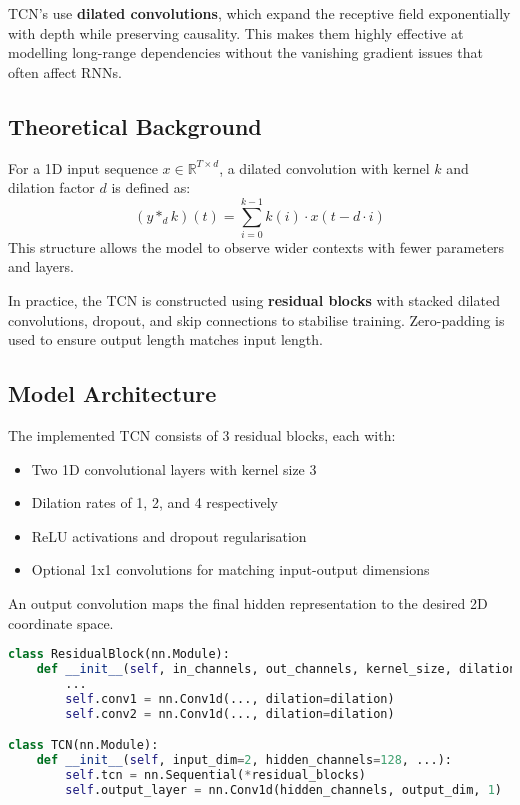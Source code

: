 TCN's use \textbf{dilated convolutions}, which expand the receptive field exponentially with depth while preserving causality. This makes them highly effective at modelling long-range dependencies without the vanishing gradient issues that often affect RNNs.

\subsection{Theoretical Background}
For a 1D input sequence $x \in \mathbb{R}^{T \times d}$, a dilated convolution with kernel $k$ and dilation factor $d$ is defined as:
\[
(y *_{d} k)(t) = \sum_{i=0}^{k-1} k(i) \cdot x(t - d \cdot i)
\]
This structure allows the model to observe wider contexts with fewer parameters and layers.

In practice, the TCN is constructed using \textbf{residual blocks} with stacked dilated convolutions, dropout, and skip connections to stabilise training. Zero-padding is used to ensure output length matches input length.

\subsection{Model Architecture}
The implemented TCN consists of 3 residual blocks, each with:
\begin{itemize}
    \item Two 1D convolutional layers with kernel size 3
    \item Dilation rates of 1, 2, and 4 respectively
    \item ReLU activations and dropout regularisation
    \item Optional 1x1 convolutions for matching input-output dimensions
\end{itemize}
An output convolution maps the final hidden representation to the desired 2D coordinate space.

\begin{lstlisting}[language=Python, caption={Simplified TCN architecture}]
class ResidualBlock(nn.Module):
    def __init__(self, in_channels, out_channels, kernel_size, dilation, dropout):
        ...
        self.conv1 = nn.Conv1d(..., dilation=dilation)
        self.conv2 = nn.Conv1d(..., dilation=dilation)

class TCN(nn.Module):
    def __init__(self, input_dim=2, hidden_channels=128, ...):
        self.tcn = nn.Sequential(*residual_blocks)
        self.output_layer = nn.Conv1d(hidden_channels, output_dim, 1)
\end{lstlisting}

